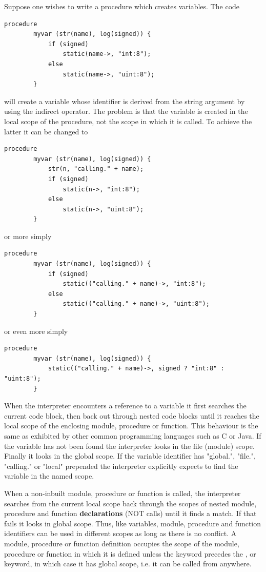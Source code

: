         Suppose one wishes to write a procedure which creates variables. The code
        \begin{lstlisting}[language=threepl]
        procedure
        myvar (str(name), log(signed)) {
            if (signed)
                static(name->, "int:8");
            else
                static(name->, "uint:8");
        }
        \end{lstlisting}
        will create a variable whose identifier is derived from the string argument
        by using the indirect operator. The problem is that the variable is
        created in the local scope of the procedure, not the scope in which it is
        called. To achieve the latter it can be changed to
        \begin{lstlisting}[language=threepl]
        procedure
        myvar (str(name), log(signed)) {
            str(n, "calling." + name);
            if (signed)
                static(n->, "int:8");
            else
                static(n->, "uint:8");
        }
        \end{lstlisting}
        or more simply
        \begin{lstlisting}[language=threepl]
        procedure
        myvar (str(name), log(signed)) {
            if (signed)
                static(("calling." + name)->, "int:8");
            else
                static(("calling." + name)->, "uint:8");
        }
        \end{lstlisting}
        or even more simply
        \begin{lstlisting}[language=threepl]
        procedure
        myvar (str(name), log(signed)) {
            static(("calling." + name)->, signed ? "int:8" : "uint:8");
        }
        \end{lstlisting}

        When the interpreter encounters a reference to a variable it first searches
        the current code block, then back out through nested code blocks until it
        reaches the local scope of the enclosing module, procedure or function. This
        behaviour is the same  as exhibited by other common programming languages such
        as C or Java. If the variable has not been found the interpreter looks in the
        file (module) scope. Finally it looks in the global scope. If the variable
        identifier has "global.", "file.", "calling." or "local" prepended the
        interpreter explicitly expects to find the variable in the named scope.        

        When a non-inbuilt module, procedure or function is called, the interpreter
        searches from the current local scope back through the scopes of nested module,
        procedure and function {\bf declarations} (NOT calls) until it finds a match.
        If that fails it looks in global scope. Thus, like variables, module, procedure
        and function identifiers can be used in different scopes as long as there is no
        conflict. A module, procedure or function definition occupies the scope of the
        module, procedure or function in which it is defined unless the keyword
         precedes the ,  or 
        keyword, in which case it has global scope, i.e. it can be called from anywhere.

